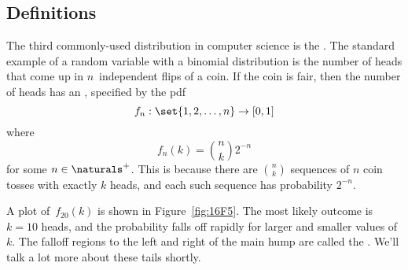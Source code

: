 \subsection{Definitions}

The third commonly-used distribution in computer science is the
.  The standard example of a random
variable with a binomial distribution is the number of heads that come
up in $n$~independent flips of a coin.  If the coin is fair, then the
number of heads has an ,
specified by the pdf
\begin{equation*}
    f_n: \set{1, 2, \dots, n} \to [0, 1]
\end{equation*}
where
\begin{equation*}
    f_n(k) = \binom{n}{k} 2^{-n}
\end{equation*}
for some $n \in \naturals^+$.  This is because there are
$\binom{n}{k}$ sequences of $n$ coin tosses with exactly $k$ heads,
and each such sequence has probability $2^{-n}$.

A plot of~$f_{20}(k)$ is shown in Figure~\ref{fig:16F5}.  The most
likely outcome is $k = 10$ heads, and the probability falls off
rapidly for larger and smaller values of $k$.  The falloff regions to
the left and right of the main hump are called the .  We'll talk a lot more about these tails shortly.

